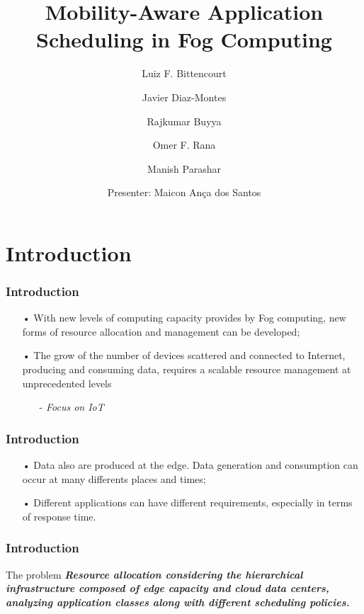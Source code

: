 \documentclass[10pt, pdf, xcolor=pdftex, dvipsnames, table]{beamer}
\title{Mobility-Aware Application Scheduling in Fog Computing}
\author{Luiz F. Bittencourt %
\and Javier Diaz-Montes %
\and Rajkumar Buyya %
\and Omer F. Rana
\and Manish Parashar
\newline
\newline
\and Presenter: Maicon Ança dos Santos
}
\begin{document}
\frame{\titlepage}



\section[Introduction]{Introduction}


\begin{frame}
	\frametitle{Introduction}
 	\begin{block}{}
 		\begin{itemize}
 			\item[•] With new levels of computing capacity provides by Fog computing, new forms of resource allocation and management can be developed;
 		    	\item[•] The grow of the number of devices scattered and connected to Internet, producing and consuming data, requires a scalable resource management at unprecedented levels
 		    	\begin{itemize}
 		    		\item[-] \footnotesize\textit{Focus on IoT}
			\end{itemize}
 		\end{itemize}
 	\end{block}
\end{frame}

\begin{frame}
	\frametitle{Introduction}
 	\begin{block}{}
 		\begin{itemize}
 			\item[•] Data also are produced at the edge. Data generation and consumption can occur at many differents places and times;
 			\newline
 		    \item[•] Different applications can have different requirements, especially in terms of response time.
 		\end{itemize}
 	\end{block}
\end{frame}

\begin{frame}
	\frametitle{Introduction}
 	\begin{block}{The problem}
 			\textit{\newline \textbf{Resource allocation considering the hierarchical infrastructure composed of edge capacity and cloud data centers, analyzing application classes along with different scheduling policies.}\newline}
 	\end{block}
\end{frame}
\end{document}
